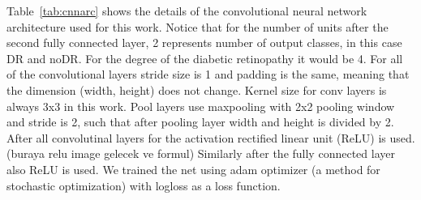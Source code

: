 Table~\ref{tab:cnnarc} shows the details of the convolutional neural network architecture used for this work. Notice that for the number of units after the second fully connected layer, 2 represents number of output classes, in this case DR and noDR. For the degree of the diabetic retinopathy it would be 4. For all of the convolutional layers stride size is 1 and padding is the same, meaning that the dimension (width, height) does not change. Kernel size for conv layers is always 3x3 in this work. Pool layers use maxpooling with 2x2 pooling window and stride is 2, such that after pooling layer width and height is divided by 2. After all convolutinal layers for the activation rectified linear unit (ReLU) is used. (buraya relu image gelecek ve formul) Similarly after the fully connected layer also ReLU is used. 
We trained the net using adam optimizer (a method for stochastic optimization) \citep{kingma2014adam} with  logloss as a loss function. 






